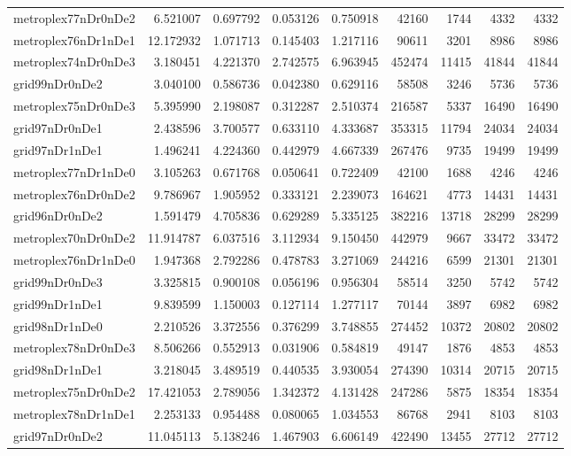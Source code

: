 \begin{longtable}{|l|r|r|r|r|r|r|r|r|}
metroplex77nDr0nDe2 & 6.521007 & 0.697792 & 0.053126 & 0.750918 & 42160 & 1744 & 4332 & 4332 \\
metroplex76nDr1nDe1 & 12.172932 & 1.071713 & 0.145403 & 1.217116 & 90611 & 3201 & 8986 & 8986 \\
metroplex74nDr0nDe3 & 3.180451 & 4.221370 & 2.742575 & 6.963945 & 452474 & 11415 & 41844 & 41844 \\
grid99nDr0nDe2 & 3.040100 & 0.586736 & 0.042380 & 0.629116 & 58508 & 3246 & 5736 & 5736 \\
metroplex75nDr0nDe3 & 5.395990 & 2.198087 & 0.312287 & 2.510374 & 216587 & 5337 & 16490 & 16490 \\
grid97nDr0nDe1 & 2.438596 & 3.700577 & 0.633110 & 4.333687 & 353315 & 11794 & 24034 & 24034 \\
grid97nDr1nDe1 & 1.496241 & 4.224360 & 0.442979 & 4.667339 & 267476 & 9735 & 19499 & 19499 \\
metroplex77nDr1nDe0 & 3.105263 & 0.671768 & 0.050641 & 0.722409 & 42100 & 1688 & 4246 & 4246 \\
metroplex76nDr0nDe2 & 9.786967 & 1.905952 & 0.333121 & 2.239073 & 164621 & 4773 & 14431 & 14431 \\
grid96nDr0nDe2 & 1.591479 & 4.705836 & 0.629289 & 5.335125 & 382216 & 13718 & 28299 & 28299 \\
metroplex70nDr0nDe2 & 11.914787 & 6.037516 & 3.112934 & 9.150450 & 442979 & 9667 & 33472 & 33472 \\
metroplex76nDr1nDe0 & 1.947368 & 2.792286 & 0.478783 & 3.271069 & 244216 & 6599 & 21301 & 21301 \\
grid99nDr0nDe3 & 3.325815 & 0.900108 & 0.056196 & 0.956304 & 58514 & 3250 & 5742 & 5742 \\
grid99nDr1nDe1 & 9.839599 & 1.150003 & 0.127114 & 1.277117 & 70144 & 3897 & 6982 & 6982 \\
grid98nDr1nDe0 & 2.210526 & 3.372556 & 0.376299 & 3.748855 & 274452 & 10372 & 20802 & 20802 \\
metroplex78nDr0nDe3 & 8.506266 & 0.552913 & 0.031906 & 0.584819 & 49147 & 1876 & 4853 & 4853 \\
grid98nDr1nDe1 & 3.218045 & 3.489519 & 0.440535 & 3.930054 & 274390 & 10314 & 20715 & 20715 \\
metroplex75nDr0nDe2 & 17.421053 & 2.789056 & 1.342372 & 4.131428 & 247286 & 5875 & 18354 & 18354 \\
metroplex78nDr1nDe1 & 2.253133 & 0.954488 & 0.080065 & 1.034553 & 86768 & 2941 & 8103 & 8103 \\
grid97nDr0nDe2 & 11.045113 & 5.138246 & 1.467903 & 6.606149 & 422490 & 13455 & 27712 & 27712 \\

\end{longtable}
